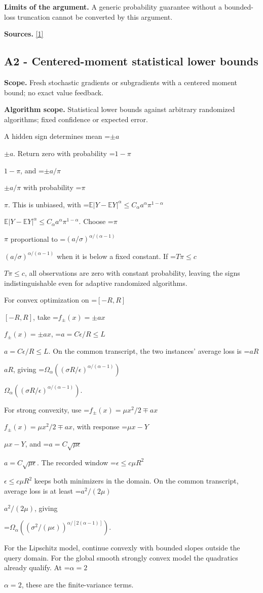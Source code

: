 \documentclass[10pt,a4paper]{article}
\newcommand{\AtlasMath}[1]{\par\begingroup\centering\setbox0=\hbox{$\displaystyle #1$}\ifdim\wd0>1.4\linewidth\typeout{ATLAS WIDE FORMULA: \the\wd0}\fi\ifdim\wd0>\linewidth\resizebox{\linewidth}{!}{\box0}\else\box0\fi\par\endgroup}
\newcommand{\AtlasInlineMath}[1]{\begingroup\setbox0=\hbox{$#1$}\ifdim\wd0>.4\linewidth\endgroup\AtlasMath{#1}\else\endgroup$#1$\fi}
\begin{document}
\textbf{Limits of the argument.} A generic probability guarantee without a bounded-loss truncation cannot be converted by this argument.

\textbf{Sources.} \href{https://proceedings.mlr.press/v202/sadiev23a/sadiev23a.pdf}{[1]}

\subsection{A2 - Centered-moment statistical lower bounds}
\textbf{Scope.} Fresh stochastic gradients or subgradients with a centered moment bound; no exact value feedback.

\textbf{Algorithm scope.} Statistical lower bounds against arbitrary randomized algorithms; fixed confidence or expected error.

A hidden sign determines mean \AtlasInlineMath{\pm a}. Return zero with probability \AtlasInlineMath{1-\pi}, and \AtlasInlineMath{\pm a/\pi} with probability \AtlasInlineMath{\pi}. This is unbiased, with
\AtlasInlineMath{\mathbb E|Y-\mathbb EY|^\alpha\le C_\alpha a^\alpha\pi^{1-\alpha}}.
Choose \AtlasInlineMath{\pi} proportional to \AtlasInlineMath{(a/\sigma)^{\alpha/(\alpha-1)}} when it is below a fixed constant. If \AtlasInlineMath{T\pi\le c}, all observations are zero with constant probability, leaving the signs indistinguishable even for adaptive randomized algorithms.

For convex optimization on \AtlasInlineMath{[-R,R]}, take \AtlasInlineMath{f_\pm(x)=\pm ax}, \AtlasInlineMath{a=C\epsilon/R\le L}. On the common transcript, the two instances' average loss is \AtlasInlineMath{aR}, giving
\AtlasInlineMath{\Omega_\alpha((\sigma R/\epsilon)^{\alpha/(\alpha-1)})}.

For strong convexity, use \AtlasInlineMath{f_\pm(x)=\mu x^2/2\mp ax}, with response \AtlasInlineMath{\mu x-Y}, and \AtlasInlineMath{a=C\sqrt{\mu\epsilon}}. The recorded window \AtlasInlineMath{\epsilon\le c\mu R^2} keeps both minimizers in the domain. On the common transcript, average loss is at least \AtlasInlineMath{a^2/(2\mu)}, giving

\AtlasMath{\Omega_\alpha((\sigma^2/(\mu\epsilon))^{\alpha/[2(\alpha-1)]}).}

For the Lipschitz model, continue convexly with bounded slopes outside the query domain. For the global smooth strongly convex model the quadratics already qualify. At \AtlasInlineMath{\alpha=2}, these are the finite-variance terms.
\end{document}
